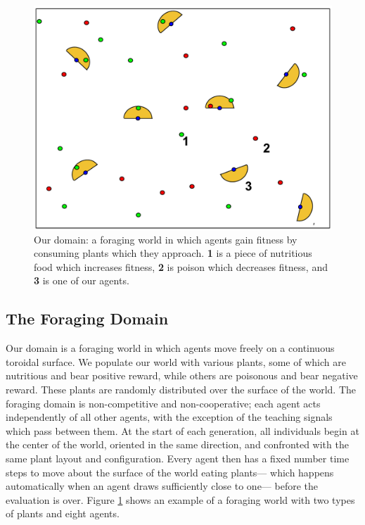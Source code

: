 \documentclass{acm_proc_article-sp}
\begin{document}
\begin{figure}[t]
  \centering
    \includegraphics[scale=.3]{world.pdf}
  \caption{Our domain: a foraging world in which agents gain fitness by consuming plants which they approach.  \textbf{1} is a piece of nutritious food which increases fitness, \textbf{2} is poison which decreases fitness, and \textbf{3} is one of our agents.}
  \label{fig:foraging-world}
\end{figure}

\subsection*{The Foraging Domain}
Our domain is a foraging world in which agents move freely on a continuous toroidal surface. We populate our world with various plants, some of which are nutritious and bear positive reward, while others are poisonous and bear negative reward. These plants are randomly distributed over the surface of the world. The foraging domain is non-competitive and non-cooperative; each agent acts independently of all other agents, with the exception of the teaching signals which pass between them. At the start of each generation, all individuals begin at the center of the world, oriented in the same direction, and confronted with the same plant layout and configuration. Every agent then has a fixed number time steps to move about the surface of the world eating plants--- which happens automatically when an agent draws sufficiently close to one--- before the evaluation is over. Figure \ref{fig:foraging-world} shows an example of a foraging world with two types of plants and eight agents.
    
\end{document}

